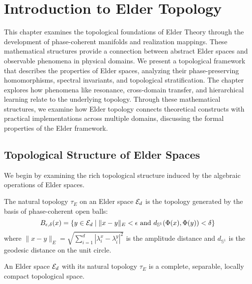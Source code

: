\chapter{Introduction to Elder Topology}

\begin{chapterabstract}
This chapter examines the topological foundations of Elder Theory through the development of phase-coherent manifolds and realization mappings. These mathematical structures provide a connection between abstract Elder spaces and observable phenomena in physical domains. We present a topological framework that describes the properties of Elder spaces, analyzing their phase-preserving homomorphisms, spectral invariants, and topological stratification. The chapter explores how phenomena like resonance, cross-domain transfer, and hierarchical learning relate to the underlying topology. Through these mathematical structures, we examine how Elder topology connects theoretical constructs with practical implementations across multiple domains, discussing the formal properties of the Elder framework.
\end{chapterabstract}

\section{Topological Structure of Elder Spaces}

We begin by examining the rich topological structure induced by the algebraic operations of Elder spaces.

\begin{definition}
The natural topology $\tau_E$ on an Elder space $\mathcal{E}_{d}$ is the topology generated by the basis of phase-coherent open balls:
\begin{equation}
B_{\epsilon,\delta}(x) = \{y \in \mathcal{E}_{d} \mid \|x - y\|_E < \epsilon \text{ and } d_{\mathbb{S}^1}(\Phi(x), \Phi(y)) < \delta\}
\end{equation}
where $\|x - y\|_E = \sqrt{\sum_{i=1}^{d}|\lambda_i^x - \lambda_i^y|^2}$ is the amplitude distance and $d_{\mathbb{S}^1}$ is the geodesic distance on the unit circle.
\end{definition}

\begin{theorem}
An Elder space $\mathcal{E}_{d}$ with its natural topology $\tau_E$ is a complete, separable, locally compact topological space.
\end{theorem}


